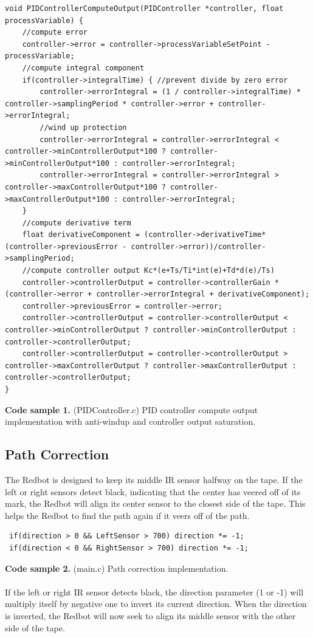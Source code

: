 \documentclass{article}
\begin{document}
\begin{lstlisting}
void PIDControllerComputeOutput(PIDController *controller, float processVariable) {
	//compute error
	controller->error = controller->processVariableSetPoint - processVariable;
	//compute integral component
	if(controller->integralTime) { //prevent divide by zero error
    	controller->errorIntegral = (1 / controller->integralTime) * controller->samplingPeriod * controller->error + controller->errorIntegral;
    	//wind up protection
    	controller->errorIntegral = controller->errorIntegral < controller->minControllerOutput*100 ? controller->minControllerOutput*100 : controller->errorIntegral;
    	controller->errorIntegral = controller->errorIntegral > controller->maxControllerOutput*100 ? controller->maxControllerOutput*100 : controller->errorIntegral;
	}
	//compute derivative term
	float derivativeComponent = (controller->derivativeTime*(controller->previousError - controller->error))/controller->samplingPeriod;
	//compute controller output Kc*(e+Ts/Ti*int(e)+Td*d(e)/Ts)
	controller->controllerOutput = controller->controllerGain * (controller->error + controller->errorIntegral + derivativeComponent);
	controller->previousError = controller->error;
	controller->controllerOutput = controller->controllerOutput < controller->minControllerOutput ? controller->minControllerOutput : controller->controllerOutput;
	controller->controllerOutput = controller->controllerOutput > controller->maxControllerOutput ? controller->maxControllerOutput : controller->controllerOutput;
}
\end{lstlisting}
\textbf{Code sample 1.} (PIDController.c) PID controller compute output implementation with anti-windup and controller output saturation.

\subsection{Path Correction}
The Redbot is designed to keep its middle IR sensor halfway on the tape.  If the left or right sensors detect black, indicating that the center has veered off of its mark, the Redbot will align its center sensor to the closest side of the tape.  This helps the Redbot to find the path again if it veers off of the path. \\
\begin{lstlisting}
 if(direction > 0 && LeftSensor > 700) direction *= -1;
 if(direction < 0 && RightSensor > 700) direction *= -1;
\end{lstlisting}
\textbf{Code sample 2.} (main.c) Path correction implementation.
\\\\
If the left or right IR sensor detects black, the direction parameter (1 or -1) will multiply itself by negative one to invert its current direction.  When the direction is inverted, the Redbot will now seek to align its middle sensor with the other side of the tape.
\end{document}
